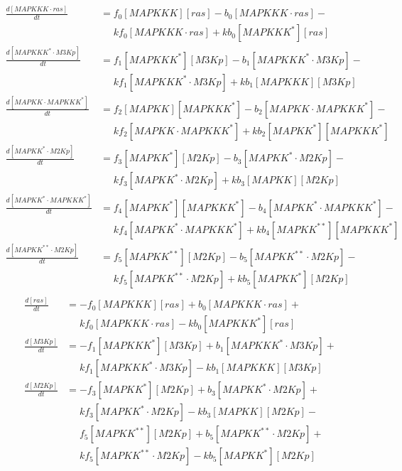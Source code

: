 \begin{equation*}
  \begin{align*}
    \frac{d[MAPKKK\cdot{}ras]}{dt} &= f_{0}[MAPKKK][ras] - b_{0}[MAPKKK\cdot{}ras] -\\
    &\phantom{=} kf_{0}[MAPKKK\cdot{}ras] + kb_{0}[MAPKKK^{*}][ras]\\
    \frac{d[MAPKKK^{*}\cdot{}M3Kp]}{dt} &= f_{1}[MAPKKK^{*}][M3Kp] - b_{1}[MAPKKK^{*}\cdot{}M3Kp] -\\
    &\phantom{=} kf_{1}[MAPKKK^{*}\cdot{}M3Kp] + kb_{1}[MAPKKK][M3Kp]\\
    \frac{d[MAPKK\cdot{}MAPKKK^{*}]}{dt} &= f_{2}[MAPKK][MAPKKK^{*}] - b_{2}[MAPKK\cdot{}MAPKKK^{*}] -\\
    &\phantom{=} kf_{2}[MAPKK\cdot{}MAPKKK^{*}] + kb_{2}[MAPKK^{*}][MAPKKK^{*}]\\
    \frac{d[MAPKK^{*}\cdot{}M2Kp]}{dt} &= f_{3}[MAPKK^{*}][M2Kp] - b_{3}[MAPKK^{*}\cdot{}M2Kp] -\\
    &\phantom{=} kf_{3}[MAPKK^{*}\cdot{}M2Kp] + kb_{3}[MAPKK][M2Kp]\\
    \frac{d[MAPKK^{*}\cdot{}MAPKKK^{*}]}{dt} &= f_{4}[MAPKK^{*}][MAPKKK^{*}] - b_{4}[MAPKK^{*}\cdot{}MAPKKK^{*}] -\\
    &\phantom{=} kf_{4}[MAPKK^{*}\cdot{}MAPKKK^{*}] + kb_{4}[MAPKK^{**}][MAPKKK^{*}]\\
    \frac{d[MAPKK^{**}\cdot{}M2Kp]}{dt} &= f_{5}[MAPKK^{**}][M2Kp] - b_{5}[MAPKK^{**}\cdot{}M2Kp] -\\
    &\phantom{=} kf_{5}[MAPKK^{**}\cdot{}M2Kp] + kb_{5}[MAPKK^{*}][M2Kp]\\
  \end{align*}
\end{equation*}
\begin{equation*}
  \begin{align*}
    \frac{d[ras]}{dt} &= -f_{0}[MAPKKK][ras] + b_{0}[MAPKKK\cdot{}ras] +\\
    &\phantom{=} kf_{0}[MAPKKK\cdot{}ras] - kb_{0}[MAPKKK^{*}][ras]\\
    \frac{d[M3Kp]}{dt} &= -f_{1}[MAPKKK^{*}][M3Kp] + b_{1}[MAPKKK^{*}\cdot{}M3Kp] +\\
    &\phantom{=} kf_{1}[MAPKKK^{*}\cdot{}M3Kp] - kb_{1}[MAPKKK][M3Kp]\\
    \frac{d[M2Kp]}{dt} &= -f_{3}[MAPKK^{*}][M2Kp] + b_{3}[MAPKK^{*}\cdot{}M2Kp] +\\
    &\phantom{=} kf_{3}[MAPKK^{*}\cdot{}M2Kp] - kb_{3}[MAPKK][M2Kp] -\\
    &\phantom{=} f_{5}[MAPKK^{**}][M2Kp] + b_{5}[MAPKK^{**}\cdot{}M2Kp] +\\
    &\phantom{=} kf_{5}[MAPKK^{**}\cdot{}M2Kp] - kb_{5}[MAPKK^{*}][M2Kp]\\
  \end{align*}
\end{equation*}
\normalsize

